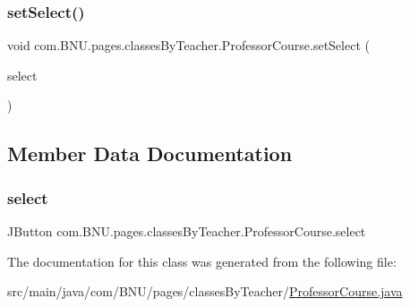 \subsubsection{\texorpdfstring{set\+Select()}{setSelect()}}
{\footnotesize\ttfamily void com.\+B\+N\+U.\+pages.\+classes\+By\+Teacher.\+Professor\+Course.\+set\+Select (\begin{DoxyParamCaption}\item[{J\+Button}]{select }\end{DoxyParamCaption})}



\subsection{Member Data Documentation}
\mbox{\label{classcom_1_1_b_n_u_1_1pages_1_1classes_by_teacher_1_1_professor_course_a20ac39fa804d23a4b71bf8edb8416067}} 
\subsubsection{\texorpdfstring{select}{select}}
{\footnotesize\ttfamily J\+Button com.\+B\+N\+U.\+pages.\+classes\+By\+Teacher.\+Professor\+Course.\+select}



The documentation for this class was generated from the following file\+:\begin{DoxyCompactItemize}
\item 
src/main/java/com/\+B\+N\+U/pages/classes\+By\+Teacher/\mbox{\hyperlink{_professor_course_8java}{Professor\+Course.\+java}}\end{DoxyCompactItemize}
